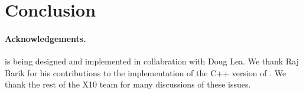 \section{Conclusion}

\paragraph{Acknowledgements.} \XWS{} is being designed and implemented in collabration with Doug Lea. We thank Raj Barik for his contributions to the implementation of the C++ version of \XWS. We thank the rest of the X10 team for many discussions of these issues.